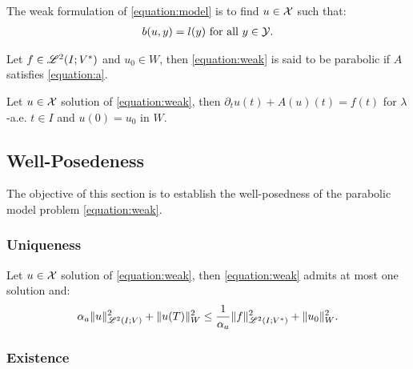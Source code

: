 \begin{definition}
    The weak formulation of \cref{equation:model} is to find $u \in \mathcal{X}$ such that:
    \begin{align}
        b(u, y) = l(y) \text{ for all } y \in \mathcal{Y}. \label{equation:weak}
    \end{align}
\end{definition}

\begin{definition}
    Let $f \in \mathscr{L}^{2}(I; V^*)$ and $u_0 \in W$, then \cref{equation:weak} is said to be parabolic if $A$ satisfies \cref{equation:a}.
\end{definition}

\begin{lemma}
    Let $u \in \mathcal{X}$ solution of \cref{equation:weak}, then $\partial_t u(t) + A(u)(t) = f(t)$ for $\lambda$-a.e. $t \in I$ and $u(0) = u_0$ in $W$.
\end{lemma}

\newpage
\subsection{Well-Posedeness} \label{subsection:well_posedeness}

The objective of this section is to establish the well-posedness of the parabolic model problem \cref{equation:weak}.

\subsubsection{Uniqueness}

\begin{lemma}
    Let $u \in \mathcal{X}$ solution of \cref{equation:weak}, then \cref{equation:weak} admits at most one solution and:
    \begin{align}
        \alpha_{a} \lVert u \rVert_{\mathscr{L}^{2}(I; V)}^2 + \lVert u(T) \rVert_W^2 \leq \frac{1}{\alpha_{a}} \lVert f \rVert_{\mathscr{L}^{2}(I; V^*)}^2 + \lVert u_0 \rVert_W^2.
    \end{align}
\end{lemma}



\subsubsection{Existence}

